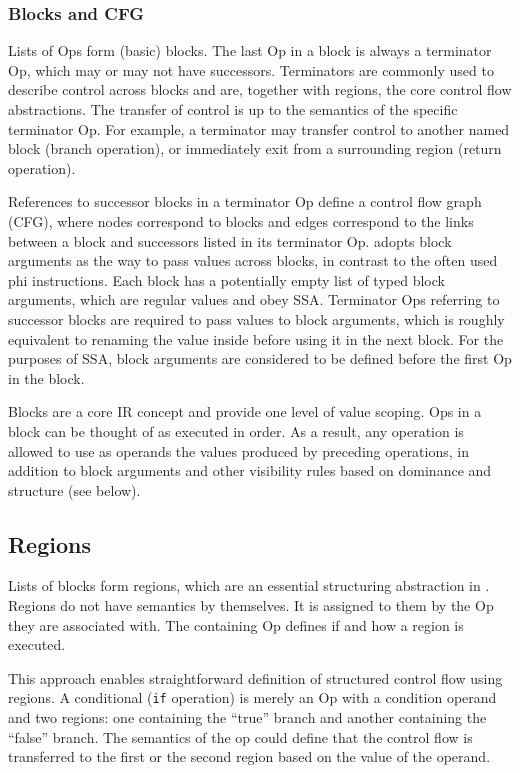 \subsubsection{Blocks and CFG}

Lists of Ops form (basic) blocks. The last Op in a block is always a terminator
Op, which may or may not have successors. Terminators are commonly used to
describe control across blocks and are, together with regions, the core control
flow abstractions. The transfer of control is up to the semantics of the
specific terminator Op. For example, a terminator may transfer control to
another named block (branch operation), or immediately exit from a surrounding
region (return operation).

References to successor blocks in a terminator Op define a control flow graph
(CFG), where nodes correspond to blocks and edges correspond to the links
between a block and successors listed in its terminator Op. \MLIR adopts block
arguments as the way to pass values across blocks, in contrast to the often
used phi instructions. Each block has a potentially empty list of typed block
arguments, which are regular values and obey SSA. Terminator Ops referring to
successor blocks are required to pass values to block arguments, which is
roughly equivalent to renaming the value inside before using it in the next
block. For the purposes of SSA, block arguments are considered to be defined
before the first Op in the block.

Blocks are a core IR concept and provide one level of value scoping. Ops in a
block can be thought of as executed in order. As a result, any operation is
allowed to use as operands the values produced by preceding operations, in
addition to block arguments and other visibility rules based on dominance and
structure (see below).

\subsection{Regions}
Lists of blocks form regions, which are an essential structuring abstraction in
\MLIR. Regions do not have semantics by themselves. It is assigned to them by
the Op they are associated with. The containing Op defines if and how a region
is executed.

This approach enables straightforward definition of structured control flow
using regions. A conditional (\lstinline!if! operation) is merely an Op with a
condition operand and two regions: one containing the ``true'' branch and another
containing the ``false'' branch. The semantics of the op could define that the
control flow is transferred to the first or the second region based on the
value of the operand.

